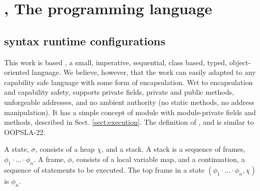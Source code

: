 \section{\LangOO, The programming language }  
\label{s:underlying}

\subsection{\LangOO syntax runtime configurations}
\label{sub:Loo} 
{This work} is based \LangOO, a {small}, imperative, sequential,  class based, typed, object-oriented language. 
 {We believe, however, that the work can easily adapted to any capability safe language with some form of encapsulation. 
Wrt to encapsulation and  capability safety},  \LangOO supports private fields, private and public methods, unforgeable addresses, and no ambient authority (no static methods, no address manipulation).
 It has a simple concept of module with module-private fields and methods, described in Sect. \ref{sect:execution}.
 The definition of , and is  similar to   OOPSLA-22.

A \LangOO state, $\sigma$,  consists of a  heap $\chi$, and a   stack. 
{A stack  is a sequence of frames, $\phi_1\!\cdot\!...\!\cdot\! \phi_n$.}
A  frame, $\phi$, consists of a local variable map, and a continuation, \ie a sequence of statements to be executed.
{
The top frame in a state $(\phi_1\!\cdot\!...\!\cdot\! \phi_n, \chi)$ is $\phi_n$.} 


 
